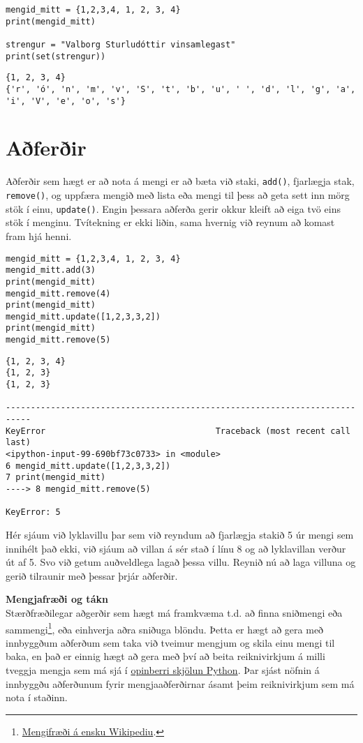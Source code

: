 \begin{lstlisting}[caption=Mengi skilgreind, label=lst:set-duplicate]
mengid_mitt = {1,2,3,4, 1, 2, 3, 4}
print(mengid_mitt) 

strengur = "Valborg Sturludóttir vinsamlegast"
print(set(strengur))
\end{lstlisting}
\lstset{style=uttak}
\begin{lstlisting}
{1, 2, 3, 4}
{'r', 'ó', 'n', 'm', 'v', 'S', 't', 'b', 'u', ' ', 'd', 'l', 'g', 'a', 'i', 'V', 'e', 'o', 's'}
\end{lstlisting}
\lstset{style=venjulegt}

\section{Aðferðir}
Aðferðir sem hægt er að nota á mengi er að bæta við staki, \texttt{add()}, fjarlægja stak, \texttt{remove()}, og uppfæra mengið með lista eða mengi til þess að geta sett inn mörg stök í einu, \texttt{update()}.
Engin þessara aðferða gerir okkur kleift að eiga tvö eins stök í menginu.
Tvítekning er ekki liðin, sama hvernig við reynum að komast fram hjá henni.

\begin{lstlisting}[caption=Mengjaaðferðir, label=lst:set-method]
mengid_mitt = {1,2,3,4, 1, 2, 3, 4}
mengid_mitt.add(3)
print(mengid_mitt)
mengid_mitt.remove(4)
print(mengid_mitt)
mengid_mitt.update([1,2,3,3,2])
print(mengid_mitt)
mengid_mitt.remove(5)
\end{lstlisting}
\lstset{style=uttak}
\begin{lstlisting}
{1, 2, 3, 4}
{1, 2, 3}
{1, 2, 3}

---------------------------------------------------------------------------
KeyError                                  Traceback (most recent call last)
<ipython-input-99-690bf73c0733> in <module>
6 mengid_mitt.update([1,2,3,3,2])
7 print(mengid_mitt)
----> 8 mengid_mitt.remove(5)

KeyError: 5
\end{lstlisting}
\lstset{style=venjulegt}

Hér sjáum við lyklavillu þar sem við reyndum að fjarlægja stakið 5 úr mengi sem innihélt það ekki, við sjáum að villan á sér stað í línu 8 og að lyklavillan verður út af 5.
Svo við getum auðveldlega lagað þessa villu.
Reynið nú að laga villuna og gerið tilraunir með þessar þrjár aðferðir.

\begin{itarefni}
\textbf{Mengjafræði og tákn}\\
Stærðfræðilegar aðgerðir sem hægt má framkvæma t.d. að finna sniðmengi eða sammengi\footnote{\href{https://en.wikipedia.org/wiki/Set_(mathematics)}{Mengifræði á ensku Wikipediu}.}, eða einhverja aðra sniðuga blöndu.
Þetta er hægt að gera með innbyggðum aðferðum sem taka við tveimur mengjum og skila einu mengi til baka, en það er einnig hægt að gera með því að beita reiknivirkjum á milli tveggja mengja sem má sjá í \href{https://docs.python.org/3/library/stdtypes.html#set}{opinberri skjölun Python}.
Þar sjást nöfnin á innbyggðu aðferðunum fyrir mengjaaðferðirnar ásamt þeim reiknivirkjum sem má nota í staðinn.
\end{itarefni}

